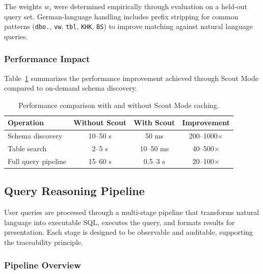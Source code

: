 The weights $w_i$ were determined empirically through evaluation on a held-out query set. German-language handling includes prefix stripping for common patterns (\texttt{dbo.}, \texttt{vw}, \texttt{tbl}, \texttt{KHK}, \texttt{BS}) to improve matching against natural language queries.

\subsubsection{Performance Impact}

Table~\ref{tab:scout-performance} summarizes the performance improvement achieved through Scout Mode compared to on-demand schema discovery.

\begin{table}[htbp]
    \centering
    \caption{Performance comparison with and without Scout Mode caching.}
    \label{tab:scout-performance}
    \begin{tabular}{lccc}
        \toprule
        \textbf{Operation} & \textbf{Without Scout} & \textbf{With Scout} & \textbf{Improvement} \\
        \midrule
        Schema discovery & 10--50 s & 50 ms & 200--1000$\times$ \\
        Table search & 2--5 s & 10--50 ms & 40--500$\times$ \\
        Full query pipeline & 15--60 s & 0.5--3 s & 20--100$\times$ \\
        \bottomrule
    \end{tabular}
\end{table}

\subsection{Query Reasoning Pipeline}
\label{subsec:query-pipeline}

User queries are processed through a multi-stage pipeline that transforms natural language into executable SQL, executes the query, and formats results for presentation. Each stage is designed to be observable and auditable, supporting the traceability principle.

\subsubsection{Pipeline Overview}

